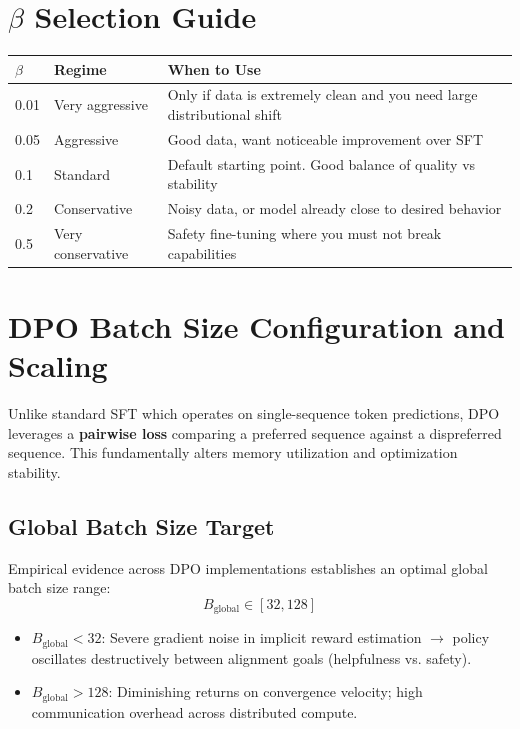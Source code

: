 \section{$\beta$ Selection Guide}
\label{beta-selection-guide}

\begin{tabular}{@{}lp{5cm}p{8cm}@{}}
\toprule
$\beta$ & \textbf{Regime} & \textbf{When to Use} \\
\midrule
0.01 & Very aggressive & Only if data is extremely clean and you need large distributional shift \\
0.05 & Aggressive & Good data, want noticeable improvement over SFT \\
0.1 & Standard & Default starting point. Good balance of quality vs stability \\
0.2 & Conservative & Noisy data, or model already close to desired behavior \\
0.5 & Very conservative & Safety fine-tuning where you must not break capabilities \\
\bottomrule
\end{tabular}

\section{DPO Batch Size Configuration and Scaling}
\label{dpo-batch-size-configuration-and-scaling}

Unlike standard SFT which operates on single-sequence token predictions, DPO leverages a \textbf{pairwise loss} comparing a preferred sequence against a dispreferred sequence. This fundamentally alters memory utilization and optimization stability.

\subsection{Global Batch Size Target}
\label{global-batch-size-target}

Empirical evidence across DPO implementations establishes an optimal global batch size range: 
\begin{equation}
\boxed{B_{\text{global}} \in [32, 128]}
\end{equation}

\begin{itemize}
  \item $B_{\text{global}} < 32$: Severe gradient noise in implicit reward estimation $\rightarrow$ policy oscillates destructively between alignment goals (helpfulness vs. safety).
  \item $B_{\text{global}} > 128$: Diminishing returns on convergence velocity; high communication overhead across distributed compute.
\end{itemize}

